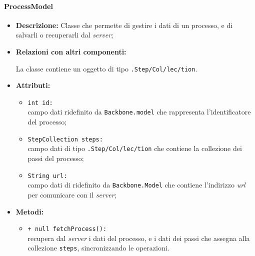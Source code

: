 \paragraph{ProcessModel}
\label{processModel}
\begin{flushleft}
\begin{itemize}
\item \textbf{Descrizione:} Classe che permette di gestire i dati di un processo, e di salvarli o recuperarli dal \textit{server};
\item \textbf{Relazioni con altri componenti:}
\begin{sloppypar}
La classe contiene un oggetto di tipo \texttt{\collection{}.Step\fshyp{}Col\fshyp{}lec\fshyp{}tion}.
\end{sloppypar}
\item \textbf{Attributi:}
\begin{sloppypar}
\begin{itemize}
\item \texttt{int id:}\\ campo dati ridefinito da \texttt{Backbone.model} che rappresenta l'identificatore del processo;
\item \texttt{StepCollection steps:}\\ campo dati di tipo \texttt{\collection{}.Step\fshyp{}Col\fshyp{}lec\fshyp{}tion} che contiene la collezione dei passi del processo;
\item \texttt{String url:}\\ campo dati di ridefinito da \texttt{Backbone.Model} che contiene l'indirizzo \textit{url} per comunicare con il \textit{server};
\end{itemize}
\end{sloppypar}
\item \textbf{Metodi:}
\begin{sloppypar}
\begin{itemize}
\item \texttt{+ null fetchProcess():}\\ recupera dal \textit{server} i dati del processo, e i dati dei passi che assegna alla collezione \texttt{steps}, sincronizzando le operazioni.
\end{itemize}
\end{sloppypar}
\end{itemize}
\end{flushleft}

